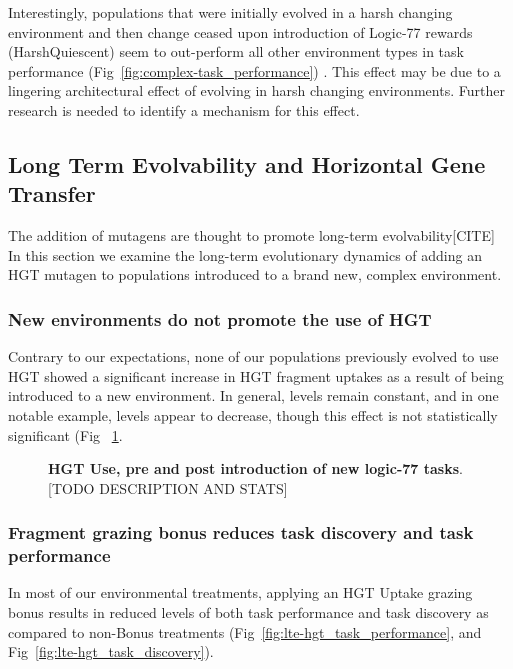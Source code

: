 \documentclass[PhD]{msu-thesis}
\begin{document}
Interestingly, populations that were initially evolved in a harsh changing environment and then change ceased upon introduction of Logic-77 rewards (HarshQuiescent) seem to out-perform all other environment types in task performance (Fig~\ref{fig:complex-task_performance}) . This effect may be due to a lingering architectural effect of evolving in harsh changing environments. Further research is needed to identify a mechanism for this effect.



\subsection{Long Term Evolvability and Horizontal Gene Transfer}
The addition of mutagens are thought to promote long-term evolvability[CITE] In this section we examine the long-term evolutionary dynamics of adding an HGT mutagen to populations introduced to a brand new, complex environment.

\subsubsection{New environments do not promote the use of HGT}
Contrary to our expectations, none of our populations previously evolved to use HGT showed a significant increase in HGT fragment uptakes as a result of being introduced to a new environment. In general, levels remain constant, and in one notable example, levels appear to decrease, though this effect is not statistically significant (Fig ~\ref{fig:lte-hgt_use}.

	\begin{figure}[!h]
	\caption{\textbf{HGT Use, pre and post introduction of new logic-77 tasks}. [TODO DESCRIPTION AND STATS]%
	}
	\label{fig:lte-hgt_use}
	\end{figure}

\subsubsection{Fragment grazing bonus reduces task discovery and task performance}
In most of our environmental treatments, applying an HGT Uptake grazing bonus results in reduced levels of both task performance and task discovery as compared to non-Bonus treatments (Fig~\ref{fig:lte-hgt_task_performance}, and Fig~\ref{fig:lte-hgt_task_discovery}).
\end{document}
